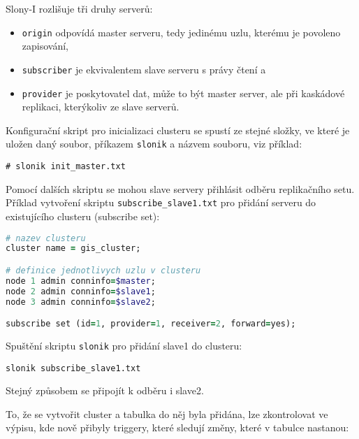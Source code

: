 Slony-I rozlišuje tři druhy serverů:
\begin{itemize}
\item \texttt{origin} odpovídá master serveru, tedy jedinému uzlu, kterému je povoleno zapisování,
\item \texttt{subscriber} je ekvivalentem slave serveru s právy čtení a 
\item \texttt{provider} je poskytovatel dat, může to být master server, ale při kaskádové replikaci, kterýkoliv ze slave serverů. 
\end{itemize}

Konfigurační skript pro inicializaci clusteru se spustí ze stejné složky, ve které je uložen daný soubor, příkazem \texttt{slonik} a názvem souboru, viz příklad:

\begin{lstlisting}
# slonik init_master.txt
\end{lstlisting}

Pomocí dalších skriptu se mohou slave servery přihlásit odběru replikačního setu. Příklad vytvoření skriptu \texttt{subscribe\_slave1.txt} pro přidání serveru do existujícího clusteru (subscribe set):

\begin{lstlisting}[language=ruby]
# nazev clusteru
cluster name = gis_cluster;

# definice jednotlivych uzlu v clusteru
node 1 admin conninfo=$master;
node 2 admin conninfo=$slave1;
node 3 admin conninfo=$slave2;

subscribe set (id=1, provider=1, receiver=2, forward=yes);
\end{lstlisting}

Spuštění skriptu \texttt{slonik} pro přidání slave1 do clusteru:

\begin{lstlisting}
slonik subscribe_slave1.txt
\end{lstlisting}

Stejný způsobem se připojít k odběru i slave2.

To, že se vytvořit cluster a tabulka do něj byla přidána, lze zkontrolovat ve výpisu, kde nově přibyly triggery, které sledují změny, které v tabulce nastanou:

